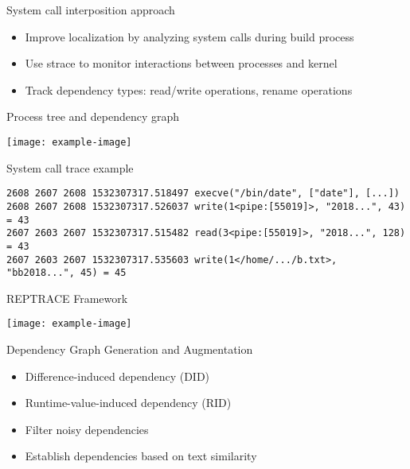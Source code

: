\documentclass{beamer}
\begin{document}
\begin{frame}{System call interposition approach}
\begin{itemize}
\item Improve localization by analyzing system calls during build process
\item Use strace to monitor interactions between processes and kernel
\item Track dependency types: read/write operations, rename operations
\end{itemize}
\end{frame}

\begin{frame}{Process tree and dependency graph}
\begin{center}
\texttt{[image: example-image]}
\end{center}
\end{frame}

\begin{frame}[fragile]{System call trace example}
\begin{scriptsize}
\begin{verbatim}
2608 2607 2608 1532307317.518497 execve("/bin/date", ["date"], [...])
2608 2607 2608 1532307317.526037 write(1<pipe:[55019]>, "2018...", 43) = 43
2607 2603 2607 1532307317.515482 read(3<pipe:[55019]>, "2018...", 128) = 43
2607 2603 2607 1532307317.535603 write(1</home/.../b.txt>, "bb2018...", 45) = 45
\end{verbatim}
\end{scriptsize}
\end{frame}

\begin{frame}{REPTRACE Framework}
\begin{center}
\texttt{[image: example-image]}
\end{center}
\end{frame}

\begin{frame}{Dependency Graph Generation and Augmentation}
\begin{itemize}
\item Difference-induced dependency (DID)
\item Runtime-value-induced dependency (RID)
\item Filter noisy dependencies
\item Establish dependencies based on text similarity
\end{itemize}
\end{frame}
\end{document}
